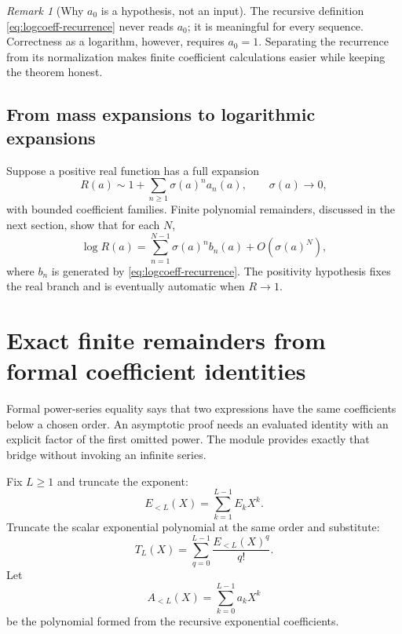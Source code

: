 \documentclass[11pt,oneside]{article}
\theoremstyle{definition}
\theoremstyle{remark}
\newtheorem{remark}[theorem]{Remark}
\begin{document}
\begin{remark}[Why $a_0$ is a hypothesis, not an input]
The recursive definition \eqref{eq:logcoeff-recurrence} never reads $a_0$; it is meaningful
for every sequence.  Correctness as a logarithm, however, requires $a_0=1$.  Separating the
recurrence from its normalization makes finite coefficient calculations easier while keeping
the theorem honest.
\end{remark}

\subsection{From mass expansions to logarithmic expansions}

Suppose a positive real function has a full expansion
\begin{equation}
 R(a)\sim1+\sum_{n\ge1}\sigma(a)^na_n(a),
 \qquad \sigma(a)\to0,
 \label{eq:mass-expansion-before-log}
\end{equation}
with bounded coefficient families.  Finite polynomial remainders, discussed in the next
section, show that for each $N$,
\begin{equation}
 \log R(a)=\sum_{n=1}^{N-1}\sigma(a)^nb_n(a)+O(\sigma(a)^N),
 \label{eq:log-asymptotic-transfer}
\end{equation}
where $b_n$ is generated by \eqref{eq:logcoeff-recurrence}.  The positivity hypothesis fixes
the real branch and is eventually automatic when $R\to1$.

\section{Exact finite remainders from formal coefficient identities}
\label{sec:finite-remainder}

Formal power-series equality says that two expressions have the same coefficients below a
chosen order.  An asymptotic proof needs an evaluated identity with an explicit factor of the
first omitted power.  The module  provides exactly
that bridge without invoking an infinite series.

Fix $L\ge1$ and truncate the exponent:
\begin{equation}
 E_{<L}(X)=\sum_{k=1}^{L-1}E_kX^k.
 \label{eq:exponent-trunc-polynomial}
\end{equation}
Truncate the scalar exponential polynomial at the same order and substitute:
\begin{equation}
 T_L(X)=\sum_{q=0}^{L-1}\frac{E_{<L}(X)^q}{q!}.
 \label{eq:finite-exp-substitution}
\end{equation}
Let
\begin{equation}
 A_{<L}(X)=\sum_{k=0}^{L-1}a_kX^k
 \label{eq:expcoeff-trunc-polynomial}
\end{equation}
be the polynomial formed from the recursive exponential coefficients.
\end{document}
